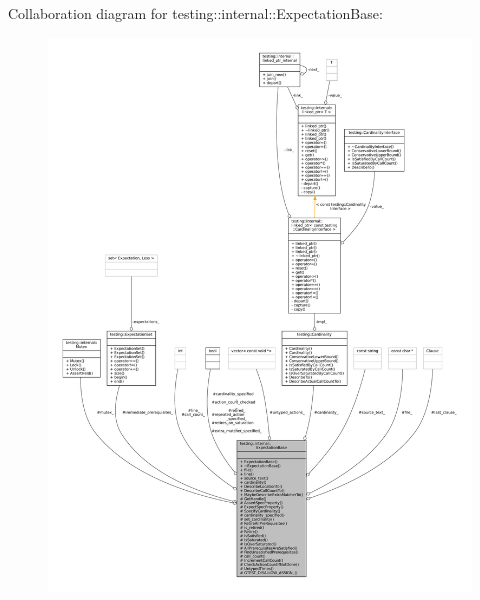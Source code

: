 Collaboration diagram for testing\+:\+:internal\+:\+:Expectation\+Base\+:
\nopagebreak
\begin{figure}[H]
\begin{center}
\leavevmode
\includegraphics[width=350pt]{classtesting_1_1internal_1_1ExpectationBase__coll__graph}
\end{center}
\end{figure}
